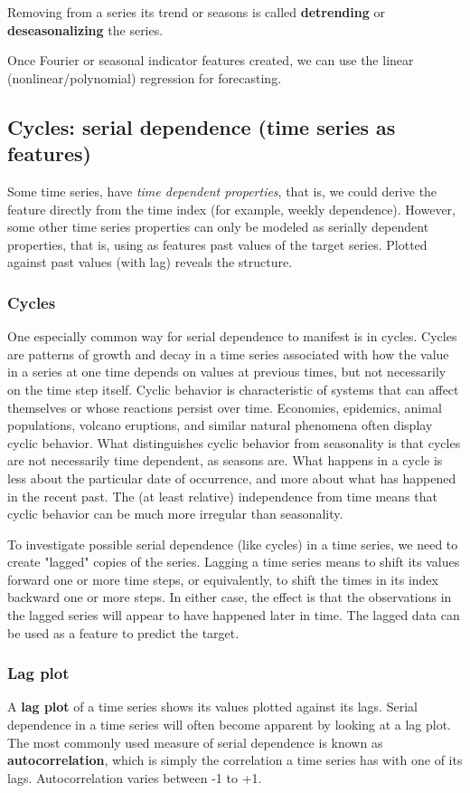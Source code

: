 \documentclass[12pt]{report}
\begin{document}
Removing from a series its trend or seasons is called \textbf{detrending} or \textbf{deseasonalizing} the series.

Once Fourier or seasonal indicator features created, we can use the linear (nonlinear/polynomial) regression for forecasting.


\subsection{Cycles: serial dependence (time series as features)}
Some time series, have \textit{time dependent properties}, that is, we could derive the feature directly from the time index (for example, weekly dependence). However, some other time series properties can only be modeled as serially dependent properties, that is, using as features past values of the target series. Plotted against past values (with lag) reveals the structure.

\subsubsection{Cycles} One especially common way for serial dependence to manifest is in cycles. Cycles are patterns of growth and decay in a time series associated with how the value in a series at one time depends on values at previous times, but not necessarily on the time step itself. Cyclic behavior is characteristic of systems that can affect themselves or whose reactions persist over time. Economies, epidemics, animal populations, volcano eruptions, and similar natural phenomena often display cyclic behavior. What distinguishes cyclic behavior from seasonality is that cycles are not necessarily time dependent, as seasons are. What happens in a cycle is less about the particular date of occurrence, and more about what has happened in the recent past. The (at least relative) independence from time means that cyclic behavior can be much more irregular than seasonality.

To investigate possible serial dependence (like cycles) in a time series, we need to create "lagged" copies of the series. Lagging a time series means to shift its values forward one or more time steps, or equivalently, to shift the times in its index backward one or more steps. In either case, the effect is that the observations in the lagged series will appear to have happened later in time. The lagged data can be used as a feature to predict the target.

\subsubsection{Lag plot}
A \textbf{lag plot} of a time series shows its values plotted against its lags. Serial dependence in a time series will often become apparent by looking at a lag plot. The most commonly used measure of serial dependence is known as \textbf{autocorrelation}, which is simply the correlation a time series has with one of its lags. Autocorrelation varies between -1 to +1.
\end{document}
